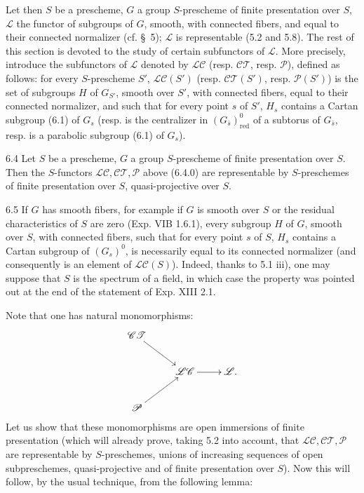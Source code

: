 \label{XV.6.4.0}
Let then $S$ be a prescheme, $G$ a group $S$-prescheme of finite presentation over $S$, $\mathscr L$ the functor of subgroups of $G$, smooth, with connected fibers, and equal to their connected normalizer (cf. \S~5); $\mathscr L$ is representable (5.2 and 5.8). The rest of this section is devoted to the study of certain subfunctors of $\mathscr L$. More precisely, introduce the subfunctors of $\mathscr L$ denoted by $\mathscr{LC}$ (resp. $\mathscr{CT}$, resp. $\mathscr P$), defined as follows: for every $S$-prescheme $S'$, $\mathscr{LC}(S')$ (resp. $\mathscr{CT}(S')$, resp. $\mathscr P(S')$) is the set of subgroups $H$ of $G_{S'}$, smooth over $S'$, with connected fibers, equal to their connected normalizer, and such that for every point $s$ of $S'$, $H_s$ contains a Cartan subgroup (6.1) of $G_s$ (resp. is the centralizer in $(G_{\bar s})^0_{\mathrm{red}}$ of a subtorus of $G_{\bar s}$, resp. is a parabolic subgroup (6.1) of $G_s$).
\begin{theorem}{6.4}\label{XV.6.4}
Let $S$ be a prescheme, $G$ a group $S$-prescheme of finite presentation over $S$. Then the $S$-functors $\mathscr{LC},\mathscr{CT},\mathscr P$ above (6.4.0) are representable by $S$-preschemes of finite presentation over $S$, quasi-projective over $S$.
\end{theorem}
\begin{remark}{6.5}\label{XV.6.5}
If $G$ has smooth fibers, for example if $G$ is smooth over $S$ or the residual characteristics of $S$ are zero (Exp. VIB 1.6.1), every subgroup $H$ of $G$, smooth over $S$, with connected fibers, such that for every point $s$ of $S$, $H_s$ contains a Cartan subgroup of $(G_s)^0$, is necessarily equal to its connected normalizer (and consequently is an element of $\mathscr{LC}(S)$). Indeed, thanks to 5.1 iii), one may suppose that $S$ is the spectrum of a field, in which case the property was pointed out at the end of the statement of Exp. XIII 2.1.
\end{remark}
Note that one has natural monomorphisms:
\[
\xymatrix{\mathscr{CT}\ar[dr]&&\\&\mathscr{LC}\ar[r]&\mathscr L.\\\mathscr P\ar[ur]&&}
\]
Let us show that these monomorphisms are open immersions of finite presentation (which will already prove, taking 5.2 into account, that $\mathscr{LC},\mathscr{CT},\mathscr P$ are representable by $S$-preschemes, unions of increasing sequences of open subpreschemes, quasi-projective and of finite presentation over $S$). Now this will follow, by the usual technique, from the following lemma:
